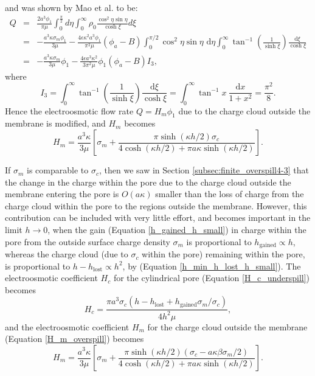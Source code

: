and was shown by Mao et al. \cite{mao2014} to be:
\begin{eqnarray}
Q  &=&  \frac{2a^3\phi_1}{\pi\mu}
\int_0^{\frac{\pi}{2}} d\eta \int_0^\infty \rho_0
\frac{\cos^2\eta\sin\eta}{\cosh\xi} d\xi
\nonumber\\
&=&-\frac{a^3\kappa\sigma_m\phi_1}{3\mu}
-\frac{4\epsilon\kappa^2a^3\phi_1}{\pi^2\mu}(\phi_a-B)
\int_0^{\pi/2}\cos^2\eta\sin\eta\text{ d}\eta \int_0^\infty 
\tan^{-1}\left(\frac{1}{\sinh\xi}\right)\frac{\text{d}\xi}{\cosh\xi}
\nonumber\\
&=&-\frac{a^3\kappa\sigma_m}{3\mu}\phi_1
-\frac{4\epsilon a^3\kappa^2}{3\pi^2\mu}\phi_1(\phi_a-B)I_3,
\label{Q_integral_disk}
\end{eqnarray}
where
\begin{equation}
I_3=
\int_0^\infty 
\tan^{-1}\left(\frac{1}{\sinh\xi}\right)\frac{\text{d}\xi}{\cosh\xi}
=\int_0^\infty \tan^{-1}x\ \frac{\text{d}x}{1+x^2}
=\frac{\pi^2}{8}.
\end{equation}
Hence the electroosmotic flow rate $Q=H_m\phi_1$
due to the charge cloud outside the
membrane is modified, and $H_m$ becomes
\begin{equation}
H_m=\frac{a^3\kappa}{3\mu}\left\lbrack
\sigma_m+
\frac{\pi\sinh(\kappa h/2)\sigma_c}
{4\cosh(\kappa h/2)+\pi a\kappa\sinh(\kappa h/2)}
\right\rbrack.
\label{H_m_overspill}
\end{equation}

If $\sigma_m$ is comparable to $\sigma_c$, then we saw in Section \ref{subsec:finite_overspill4-3} that
the change in the charge within the pore due to the charge cloud outside
the membrane entering the pore is $O(a\kappa)$ smaller than the loss of
charge from the charge cloud within the pore to the regions
outside the membrane. However, this contribution can be included
with very little effort, and becomes important in the limit
$h\rightarrow 0$, when the gain (Equation \ref{h_gained_h_small})
in charge within the pore
from the outside surface charge density $\sigma_m$
is proportional to $h_\text{gained}\propto h$,
whereas the charge cloud (due to $\sigma_c$ within the pore)
remaining within the pore, is
proportional to $h-h_\text{lost}\propto h^2$, by
(Equation \ref{h_min_h_lost_h_small}).
The electroosmotic coefficient $H_c$
for the cylindrical pore (Equation \ref{H_c_underspill}) becomes
\begin{equation}
H_c=\frac{\pi a^3\sigma_c(h-h_\text{lost}+h_\text{gained}\sigma_m/\sigma_c)}
{4h^2\mu},
\label{H_c_overspill_underspill}
\end{equation}
and the electroosmotic coefficient $H_m$ for the charge cloud
outside the membrane (Equation \ref{H_m_overspill}) becomes
\begin{equation}
H_m=\frac{a^3\kappa}{3\mu}\left\lbrack
\sigma_m+
\frac{\pi\sinh(\kappa h/2)(\sigma_c-a\kappa\beta\sigma_m/2)}
{4\cosh(\kappa h/2)+\pi a\kappa\sinh(\kappa h/2)}
\right\rbrack.
\label{H_m_overspill_underspill}
\end{equation}

